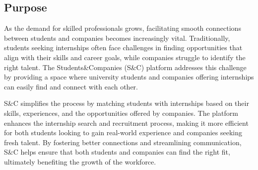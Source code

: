 



\subsection{Purpose}
As the demand for skilled professionals grows, facilitating smooth connections between students and companies becomes increasingly vital. Traditionally, students seeking internships often face challenges in finding opportunities that align with their skills and career goals, while companies struggle to identify the right talent. The Students\&Companies (S\&C) platform addresses this challenge by providing a space where university students and companies offering internships can easily find and connect with each other.

S\&C simplifies the process by matching students with internships based on their skills, experiences, and the opportunities offered by companies. The platform enhances the internship search and recruitment process, making it more efficient for both students looking to gain real-world experience and companies seeking fresh talent. By fostering better connections and streamlining communication, S\&C helps ensure that both students and companies can find the right fit, ultimately benefiting the growth of the workforce.
